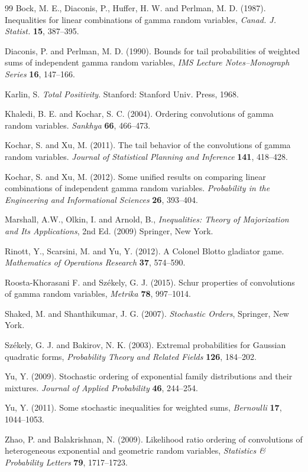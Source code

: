 \documentclass[11pt]{article}
\begin{document}
\begin{thebibliography}{99}
Bock, M. E., Diaconis, P., Huffer, H. W. and Perlman, M. D. (1987).  Inequalities for linear combinations of gamma random variables, {\it Canad. J. Statist.} {\bf 15}, 387--395. 

Diaconis, P. and Perlman, M. D. (1990).  Bounds for tail probabilities of weighted sums of independent gamma random variables, {\it IMS Lecture Notes--Monograph Series} {\bf 16}, 147--166.

Karlin, S. {\it Total Positivity}. Stanford: Stanford Univ. Press, 1968. 

Khaledi, B. E. and Kochar, S. C. (2004). Ordering convolutions of gamma random variables. {\it Sankhya} {\bf 66}, 466--473. 

Kochar, S. and Xu, M. (2011). The tail behavior of the convolutions of gamma random variables. {\it Journal of Statistical Planning and Inference} {\bf 141}, 418--428.

Kochar, S. and Xu, M. (2012). Some unified results on comparing linear combinations of independent gamma random variables. {\it Probability in the Engineering and Informational Sciences} {\bf 26}, 393--404.

Marshall, A.W., Olkin, I. and Arnold, B., {\it Inequalities: Theory of Majorization and Its Applications}, 2nd Ed. (2009) Springer, New York.


Rinott, Y., Scarsini, M. and Yu, Y. (2012). A Colonel Blotto gladiator game.  {\it Mathematics of Operations Research} {\bf 37}, 574--590. 

Roosta-Khorasani F. and Sz\'{e}kely, G. J. (2015). Schur properties of convolutions of gamma random variables, {\it Metrika} {\bf 78}, 997--1014.

Shaked, M. and Shanthikumar, J. G. (2007). {\it Stochastic Orders}, Springer, New York. 

Sz\'{e}kely, G. J. and Bakirov, N. K. (2003). Extremal probabilities for Gaussian quadratic forms, {\it Probability Theory and Related Fields} {\bf 126}, 184--202.

Yu, Y. (2009).  Stochastic ordering of exponential family distributions and their mixtures. {\it Journal of 
Applied Probability} {\bf 46}, 244--254.

Yu, Y. (2011).  Some stochastic inequalities for weighted sums, {\it Bernoulli} {\bf 17}, 1044--1053.

Zhao, P. and Balakrishnan, N. (2009).  Likelihood ratio ordering of convolutions of heterogeneous exponential and geometric random variables, {\it Statistics \& Probability Letters} {\bf 79}, 1717--1723. 

\end{thebibliography}
\end{document}
